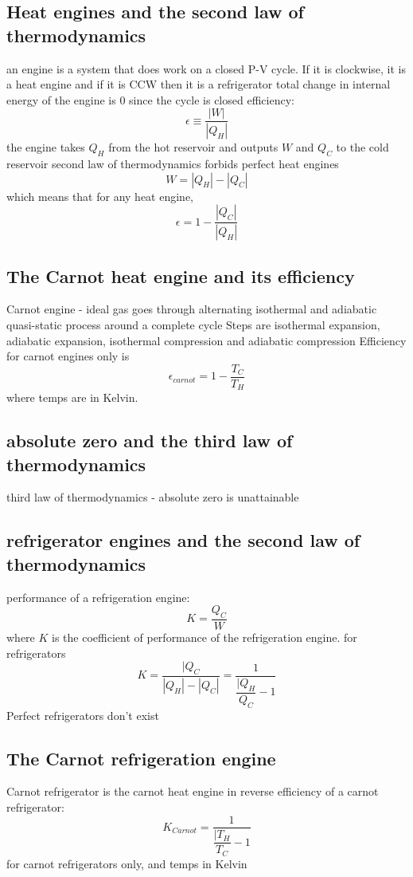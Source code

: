\documentclass[twocolumn]{article}
\begin{document}
\subsection{Heat engines and the second law of thermodynamics}
\begin{outline}
\1 an engine is a system that does work on a closed P-V cycle. If it is clockwise, it is a heat engine and if it is CCW then it is a refrigerator
\1 total change in internal energy of the engine is 0 since the cycle is closed
\1 efficiency: \[\epsilon\equiv\dfrac{|W|}{|Q_H|}\]
\1 the engine takes $Q_H$ from the hot reservoir and outputs $W$ and $Q_C$ to the cold reservoir
\1 second law of thermodynamics forbids perfect heat engines
\0 \[W=|Q_H|-|Q_C|\] which means that for any heat engine, \[\epsilon=1-\dfrac{|Q_C|}{|Q_H|}\]
\end{outline}
\subsection{The Carnot heat engine and its efficiency}
\begin{outline}
\1 Carnot engine - ideal gas goes through alternating isothermal and adiabatic quasi-static process around a complete cycle
\1 Steps are isothermal expansion, adiabatic expansion, isothermal compression and adiabatic compression
\1 Efficiency for carnot engines only is \[\epsilon_{carnot}=1-\dfrac{T_C}{T_H}\] where temps are in Kelvin. 
\end{outline}
\subsection{absolute zero and the third law of thermodynamics}
\begin{outline}
\1 third law of thermodynamics - absolute zero is unattainable
\end{outline}
\subsection{refrigerator engines and the second law of thermodynamics}
\begin{outline}
\1 performance of a refrigeration engine: \[K=\dfrac{Q_C}{W}\] where $K$ is the coefficient of performance of the refrigeration engine. 
\1 for refrigerators \[K=\dfrac{|Q_C}{|Q_H|-|Q_C|}=\dfrac{1}{\dfrac{|Q_H}{Q_C}-1}\]
\1 Perfect refrigerators don't exist
\end{outline}
\subsection{The Carnot refrigeration engine}
\begin{outline}
\1 Carnot refrigerator is the carnot heat engine in reverse
\1 efficiency of a carnot refrigerator: \[K_{Carnot}=\dfrac{1}{\dfrac{|T_H}{T_C}-1}\] for carnot refrigerators only, and temps in Kelvin
\end{outline}
\end{document}
